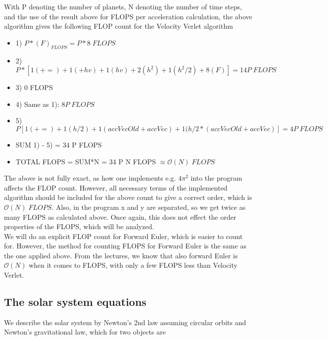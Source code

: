 \documentclass{article}
\begin{document}
With P denoting the number of planets, N denoting the number of time steps, and the use of the result above for FLOPS per acceleration calculation, the above algorithm gives the following FLOP count for the Velocity Verlet algorithm

\begin{itemize}
	\item  1) $P*(F)_{FLOPS} = P*8\; FLOPS$
	
	\item 2) $P*[1(+=) + 1(+hv) + 1(hv) +2(h^2) + 1(h^2/2) + 8 (F)] = 14 P \; FLOPS$
	
	\item 3) 0 FLOPS
	
	\item 4) Same as 1): $8P\; FLOPS$
	
	\item 5) $P[1(+=) + 1(h/2) + 1(accVecOld + accVec) + 1(h/2*(accVecOld + accVec)] = 4P\;FLOPS$
	
	\item SUM 1) - 5) = 34 P FLOPS
	
	\item TOTAL FLOPS = SUM*N = 34 P N FLOPS $\approx \mathcal{O}(N)\;FLOPS$
\end{itemize}

The above is not fully exact, as how one implements e.g. $4 \pi^2$ into the program affects the FLOP count. However, all necessary terms of the implemented algorithm should be included for the above count to give a correct order, which is $\mathcal{O}(N)\;FLOPS$. Also, in the program x and y are separated, so we get twice as many FLOPS as calculated above. Once again, this does not effect the order properties of the FLOPS, which will be analyzed.\\

We will do an explicit FLOP count for Forward Euler, which is easier to count for. However, the method for counting FLOPS for Forward Euler is the same as the one applied above. From the lectures, we know that also forward Euler is $\mathcal{O}(N)$ when it comes to FLOPS, with only a few FLOPS less than Velocity Verlet.



\subsection{The solar system equations}
We describe the solar system by Newton's 2nd law assuming circular orbits and Newton's gravitational law, which for two objects are
\end{document}
